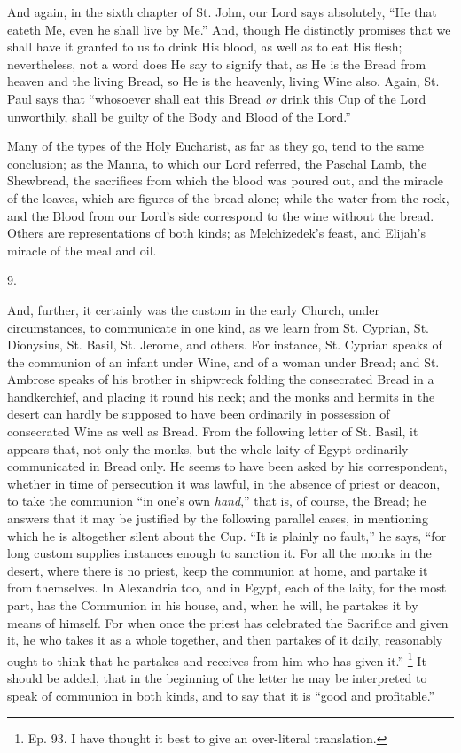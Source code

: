 And again, in the sixth chapter of St. John, our Lord
says absolutely, ``He that eateth Me, even he shall
live by Me.'' And, though He distinctly promises that
we shall have it granted to us to drink His blood, as
well as to eat His flesh; nevertheless, not a word does
He say to signify that, as He is the Bread from heaven
and the living Bread, so He is the heavenly, living Wine
also. Again, St. Paul says that ``whosoever shall eat
this Bread \emph{or} drink this Cup of the Lord
unworthily, shall be guilty of the Body and Blood of the
Lord.''

Many of the types of the Holy Eucharist, as far as
they go, tend to the same conclusion; as the Manna, to
which our Lord referred, the Paschal Lamb, the Shewbread,
the sacrifices from which the blood was poured out, and
the miracle of the loaves, which are figures of the bread
alone; while the water from the rock, and the Blood from
our Lord's side correspond to the wine without the bread.
Others are representations of both kinds; as
Melchizedek's feast, and Elijah's miracle of the meal and
oil.

9.

And, further, it certainly was the custom in the early
Church, under circumstances, to communicate in one kind,
as we learn from St. Cyprian, St. Dionysius, St. Basil,
St. Jerome, and others. For instance, St. Cyprian speaks
of the communion of an infant under Wine, and of a woman
under Bread; and St. Ambrose speaks of his brother in
shipwreck folding the consecrated Bread in a
handkerchief, and placing it round his neck; and the
monks and hermits in the desert can hardly be supposed to
have been ordinarily in possession of consecrated Wine as
well as Bread. From the following letter of St. Basil, it
appears that, not only the monks, but the whole laity of
Egypt ordinarily communicated in Bread only. He seems to
have been asked by his correspondent, whether in time of
persecution it was lawful, in the absence of priest or
deacon, to take the communion ``in one's own \emph{hand},''
that is, of course, the Bread; he answers that it may be
justified by the following parallel cases, in mentioning
which he is altogether silent about the Cup. ``It is
plainly no fault,'' he says, ``for long custom
supplies instances enough to sanction it. For all the
monks in the desert, where there is no priest, keep the
communion at home, and partake it from themselves. In
Alexandria too, and in Egypt, each of the laity, for the
most part, has the Communion in his house, and, when he
will, he partakes it by means of himself. For when once
the priest has celebrated the Sacrifice and given it, he
who takes it as a whole together, and then partakes of it
daily, reasonably ought to think that he partakes and
receives from him who has given it.'' \footnote{Ep. 93. I have thought it best
to give an over-literal translation.} It
should be added, that in the beginning of the letter he
may be interpreted to speak of communion in both kinds,
and to say that it is ``good and profitable.''

